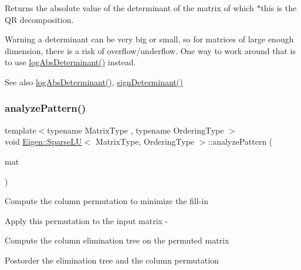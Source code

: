 \begin{DoxyReturn}{Returns}
the absolute value of the determinant of the matrix of which $\ast$this is the QR decomposition.
\end{DoxyReturn}
\begin{DoxyWarning}{Warning}
a determinant can be very big or small, so for matrices of large enough dimension, there is a risk of overflow/underflow. One way to work around that is to use \mbox{\hyperlink{class_eigen_1_1_sparse_l_u_a89e30a7df205596784a5a73f4768eaec}{log\+Abs\+Determinant()}} instead.
\end{DoxyWarning}
\begin{DoxySeeAlso}{See also}
\mbox{\hyperlink{class_eigen_1_1_sparse_l_u_a89e30a7df205596784a5a73f4768eaec}{log\+Abs\+Determinant()}}, \mbox{\hyperlink{class_eigen_1_1_sparse_l_u_a6651143e3b18fa90cfb3808b6fd23c4e}{sign\+Determinant()}} 
\end{DoxySeeAlso}
\mbox{\label{class_eigen_1_1_sparse_l_u_aa907ff958c4f4855145091d2686f3a8a}} 
\subsubsection{\texorpdfstring{analyzePattern()}{analyzePattern()}}
{\footnotesize\ttfamily template$<$typename Matrix\+Type , typename Ordering\+Type $>$ \\
void \mbox{\hyperlink{class_eigen_1_1_sparse_l_u}{Eigen\+::\+Sparse\+LU}}$<$ Matrix\+Type, Ordering\+Type $>$\+::analyze\+Pattern (\begin{DoxyParamCaption}\item[{const Matrix\+Type \&}]{mat }\end{DoxyParamCaption})}

Compute the column permutation to minimize the fill-\/in


\begin{DoxyItemize}
\item Apply this permutation to the input matrix -\/
\item Compute the column elimination tree on the permuted matrix
\item Postorder the elimination tree and the column permutation 
\end{DoxyItemize}\mbox{\label{class_eigen_1_1_sparse_l_u_ab7b0d15d0d9fd1faa164298f92ca59cd}} 
